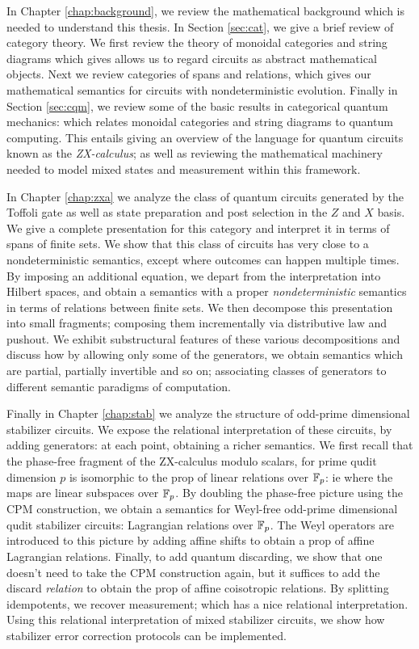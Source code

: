 \documentclass[12pt]{ociamthesis}  %
\begin{document}
In Chapter \ref{chap:background}, we review the mathematical background which is needed to understand this thesis.  In Section \ref{sec:cat}, we give a brief review of category theory.  We first review the theory of monoidal categories and string diagrams which gives allows us to regard circuits as abstract mathematical objects.  Next we review categories of spans and relations, which gives our mathematical semantics for circuits with nondeterministic evolution.  Finally in Section \ref{sec:cqm}, we review some of the basic results in categorical quantum mechanics: which relates monoidal categories and string diagrams to quantum computing. This entails giving an overview of the language for quantum circuits known as the {\em ZX-calculus}; as well as reviewing the mathematical machinery needed to model mixed states and measurement within this framework.

In Chapter \ref{chap:zxa} we analyze the class of quantum circuits generated by the Toffoli gate as well as state preparation and post selection in the $Z$ and $X$ basis.  We give a complete presentation for this category and interpret it in terms of spans of finite sets.  We show that this class of circuits has very close to a nondeterministic semantics, except where outcomes can happen multiple times.  By imposing an additional equation, we depart from the interpretation into Hilbert spaces, and obtain a semantics with a proper {\em nondeterministic} semantics in terms of relations between finite sets. We then decompose this presentation into small fragments; composing them incrementally via distributive law and pushout.
We exhibit substructural features of these various decompositions and discuss how by allowing only some of the generators, we obtain semantics which are partial, partially invertible and so on; associating classes of generators to different semantic paradigms of computation.


Finally in Chapter \ref{chap:stab}  we analyze the structure of odd-prime dimensional stabilizer circuits.
We expose the relational interpretation of these circuits, by adding generators: at each point, obtaining a richer semantics.  We first recall that the phase-free fragment of the ZX-calculus modulo scalars, for prime qudit dimension $p$ is isomorphic to the prop of linear relations over $\mathbb{F}_p$: ie where the maps are linear subspaces over $\mathbb{F}_p$.  By doubling the phase-free picture using the CPM construction, we obtain a semantics for Weyl-free odd-prime dimensional qudit stabilizer circuits: Lagrangian relations over $\mathbb{F}_p$.  The Weyl operators are introduced to this picture by adding affine shifts to obtain a prop of affine Lagrangian relations.  Finally, to add quantum discarding, we show that one doesn't need to take the CPM construction again, but it suffices to add the discard {\em relation} to obtain the prop of affine coisotropic relations.  By splitting idempotents, we recover measurement; which has a nice relational interpretation.  Using this relational interpretation of mixed stabilizer circuits, we show how stabilizer error correction protocols can be implemented.
\end{document}
